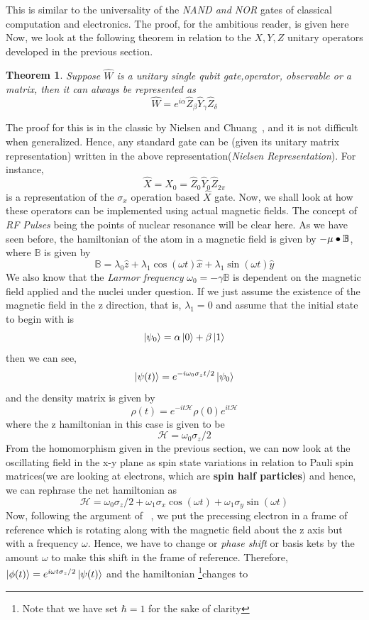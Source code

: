\documentclass[12pt]{article}
\newtheorem{theorem}{Theorem}
\begin{document}
This is similar to the universality of the \textit{NAND and NOR} gates of classical computation and electronics. The proof, for the ambitious reader, is given here ~\cite{ddv} Now, we look at the following theorem in relation to the $X,Y,Z$ unitary operators developed in the previous section.
\begin{theorem}
Suppose $\hat{W}$ is a unitary single qubit gate,operator, observable or a matrix, then it can always be represented as 
$$\hat{W} = e^{i\alpha}\hat{Z}_\beta\hat{Y}_\gamma\hat{Z}_\delta$$
\end{theorem}
The proof for this is in the classic by Nielsen and Chuang~\cite{mni}, and it is not difficult when generalized. Hence, any standard gate can be (given its unitary matrix representation) written in the above representation(\textit{Nielsen Representation}). For instance, $$\hat{X} = X_0 = \hat{Z}_0\hat{Y}_0\hat{Z}_{2\pi} $$
is a representation of the $\sigma_x$ operation based $\hat{X}$ gate. Now, we shall look at how these operators can be implemented using actual magnetic fields. The concept of \textit{RF Pulses} being the points of nuclear resonance will be clear here. As we have seen before, the hamiltonian of the atom in a magnetic field is given by $-{\mu}\bullet{\mathbb{B}}$, where $\mathbb{B}$ is given by $$\mathbb{B} = \lambda_0\hat{z}+\lambda_1\cos (\omega t)\hat{x} + \lambda_1\sin (\omega t)\hat{y}$$ We also know that the \textit{Larmor frequency} $\omega_0 = -\gamma\mathbb{B}$ is dependent on the magnetic field applied and the nuclei under question. 	If we just assume the existence of the magnetic field in the z direction, that is, $\lambda_1 = 0$ and assume that the initial state to begin with is $$\ket{\psi_0} = \alpha\ket{0} + \beta\ket{1}$$ then we can see,
$$\ket{\psi (t)} = e^{-i\omega_0\sigma_z t/2}\ket{\psi_0}$$
and the density matrix is given by $$\rho(t) = e^{-it\mathcal{H}}\rho(0)e^{it\mathcal{H}}$$ where the z hamiltonian in this case is given to be $$\mathcal{H} = \omega_0\sigma_z/2$$ From the homomorphism given in the previous section, we can now look at the oscillating field in the x-y plane as spin state variations in relation to Pauli spin matrices(we are looking at electrons, which are \textbf{spin half particles}) and hence, we can rephrase the net hamiltonian as $$\mathcal{H} = \omega_0\sigma_z/2 + \omega_1\sigma_x\cos(\omega t) + \omega_1\sigma_y\sin(\omega t)$$
Now, following the argument of ~\cite{ohio}, we put the precessing electron in a frame of reference which is rotating along with the magnetic field about the z axis but with a frequency $\omega$. Hence, we have to change or \textit{phase shift} or basis kets by the amount $\omega$ to make this shift in the frame of reference. Therefore, $\ket{\phi (t)} = e^{i\omega t\sigma_z/2}\ket{\psi(t)}$ and the hamiltonian \footnote{Note that we have set $\hbar = 1$ for the sake of clarity}changes to
\end{document}
